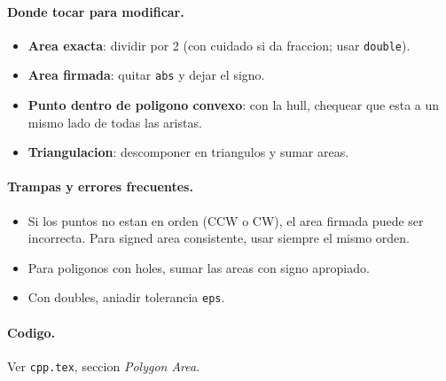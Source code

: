 \paragraph{Donde tocar para modificar.}
\begin{itemize}\setlength\itemsep{0pt}
	\item \textbf{Area exacta}: dividir por 2 (con cuidado si da fraccion; usar \texttt{double}).
	\item \textbf{Area firmada}: quitar \texttt{abs} y dejar el signo.
	\item \textbf{Punto dentro de poligono convexo}: con la hull, chequear que esta a un mismo lado de todas las aristas.
	\item \textbf{Triangulacion}: descomponer en triangulos y sumar areas.
\end{itemize}

\paragraph{Trampas y errores frecuentes.}
\begin{itemize}\setlength\itemsep{0pt}
	\item Si los puntos no estan en orden (CCW o CW), el area firmada puede ser incorrecta. Para signed area consistente, usar siempre el mismo orden.
	\item Para poligonos con holes, sumar las areas con signo apropiado.
	\item Con doubles, aniadir tolerancia \texttt{eps}.
\end{itemize}

\paragraph{Codigo.}
Ver \texttt{cpp.tex}, seccion \textit{Polygon Area}.

\vspace{0.5em}
